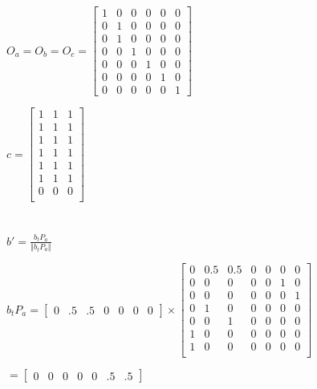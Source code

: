 \documentclass[12pt]{article}
\begin{document}
$ O_a = O_b = O_c = \begin{bmatrix}
1 & 0 & 0 & 0 & 0 & 0 \\
0 & 1 & 0 & 0 & 0 & 0 \\
0 & 1 & 0 & 0 & 0 & 0 \\
0 & 0 & 1 & 0 & 0 & 0 \\
0 & 0 & 0 & 1 & 0 & 0 \\
0 & 0 & 0 & 0 & 1 & 0 \\
0 & 0 & 0 & 0 & 0 & 1
\end{bmatrix}
$

$ c = \begin{bmatrix}
1 & 1 & 1 \\
1 & 1 & 1 \\
1 & 1 & 1 \\
1 & 1 & 1 \\
1 & 1 & 1 \\
1 & 1 & 1 \\
0 & 0 & 0 \\
\end{bmatrix}
$

\section{}
\subsection {}

$ b' = \frac{b_t P_a}{\Vert b_t P_a \Vert} $

$ b_t P_a = \begin{bmatrix}0 & .5 & .5 & 0 & 0 & 0 & 0\end{bmatrix} \times \begin{bmatrix}
0   & 0.5 & 0.5 & 0   & 0   & 0   & 0 \\
0   & 0   & 0   & 0   & 0   & 1   & 0 \\
0   & 0   & 0   & 0   & 0   & 0   & 1 \\
0   & 1   & 0   & 0   & 0   & 0   & 0 \\
0   & 0   & 1   & 0   & 0   & 0   & 0 \\
1   & 0   & 0   & 0   & 0   & 0   & 0 \\
1   & 0   & 0   & 0   & 0   & 0   & 0 \\
\end{bmatrix}$

$ = \begin{bmatrix}0 & 0 & 0 & 0 & 0 & .5 & .5\end{bmatrix} $
\end{document}
